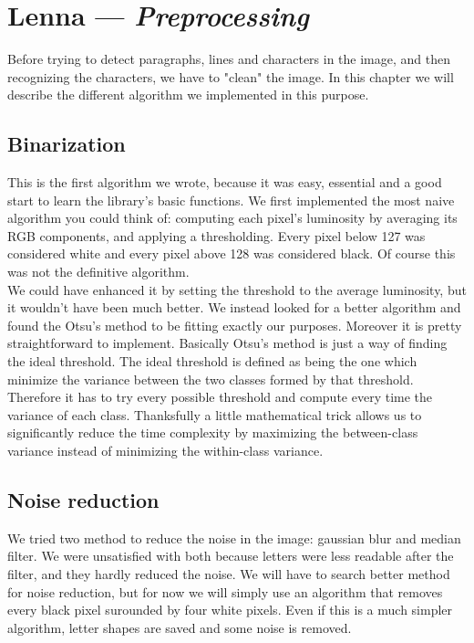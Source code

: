 \chapter{Lenna --- \emph{Preprocessing}}

Before trying to detect paragraphs, lines and characters in the image, and then recognizing the characters, we have to "clean" the image. In this chapter we will describe the different algorithm we implemented in this purpose.

\section{Binarization}
This is the first algorithm we wrote, because it was easy, essential and a good
start to learn the library's basic functions. We first implemented the most
naive algorithm you could think of: computing each pixel's luminosity by
averaging its RGB components, and applying a thresholding. Every pixel below 127
was considered white and every pixel above 128 was considered black.
Of course this was not the definitive algorithm.\\

We could have enhanced it by setting the threshold to the average luminosity,
but it wouldn't have been much better. We instead looked for a better algorithm
and found the Otsu's method to be fitting exactly our purposes. Moreover it is
pretty straightforward to implement. Basically Otsu's method is just a way of
finding the ideal threshold. The ideal threshold is defined as being the one
which minimize the variance between the two classes formed by that threshold.
Therefore it has to try every possible threshold and compute every time the
variance of each class. Thanksfully a little mathematical trick allows us to
significantly reduce the time complexity by maximizing the between-class
variance instead of minimizing the within-class variance.\\

\section{Noise reduction}

We tried two method to reduce the noise in the image: gaussian blur and median
filter. We were unsatisfied with both because letters were less readable after
the filter, and they hardly reduced the noise. We will have to search better
method for noise reduction, but for now we will simply use an algorithm that
removes every black pixel surounded by four white pixels. Even if this is a much
simpler algorithm, letter shapes are saved and some noise is removed.

